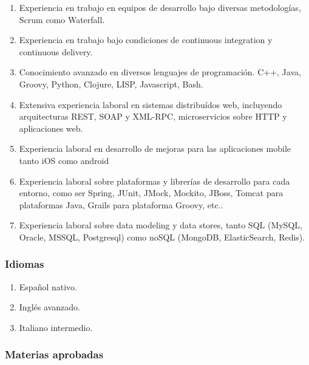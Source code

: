 \documentclass[a4paper,11pt]{article}
\begin{document}
\begin{enumerate}

  \item Experiencia en trabajo en equipos de desarrollo bajo diversas
    metodologías, Scrum como Waterfall.

  \item Experiencia en trabajo bajo condiciones de continuous integration y
    continuous delivery.

  \item Conocimiento avanzado en diversos lenguajes de programación. C++,
    Java, Groovy, Python, Clojure, LISP, Javascript, Bash.

  \item Extensiva experiencia laboral en sistemas distribuídos web, incluyendo
    arquitecturas REST, SOAP y XML-RPC, microservicios sobre HTTP y
    aplicaciones web.

  \item Experiencia laboral en desarrollo de mejoras para las aplicaciones
    mobile tanto iOS como android

  \item Experiencia laboral sobre plataformas y librerías de desarrollo para
    cada entorno, como ser Spring, JUnit, JMock, Mockito, JBoss, Tomcat para
    plataformas Java, Grails para plataforma Groovy, etc..

  \item Experiencia laboral sobre data modeling y data stores, tanto SQL
    (MySQL, Oracle, MSSQL, Postgresql) como noSQL (MongoDB, ElasticSearch,
    Redis).

\end{enumerate}

\subsubsection{Idiomas}

\begin{enumerate}

  \item Español nativo.

  \item Inglés avanzado.

  \item Italiano intermedio.

\end{enumerate}

\subsubsection{Materias aprobadas}
\end{document}
